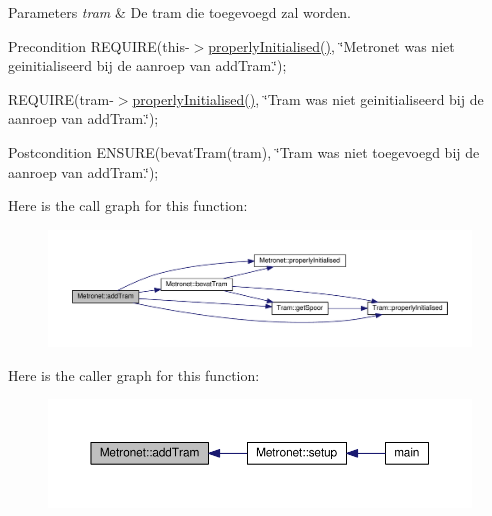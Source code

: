 \begin{DoxyParams}{Parameters}
{\em tram} & De tram die toegevoegd zal worden. \\
\hline
\end{DoxyParams}
\begin{DoxyPrecond}{Precondition}
R\+E\+Q\+U\+I\+RE(this-\/$>$\hyperlink{class_metronet_a3d2adce29a947f162924279b766de645}{properly\+Initialised()}, \char`\"{}\+Metronet was niet geinitialiseerd bij de aanroep van add\+Tram.\char`\"{}); 

R\+E\+Q\+U\+I\+RE(tram-\/$>$\hyperlink{class_metronet_a3d2adce29a947f162924279b766de645}{properly\+Initialised()}, \char`\"{}\+Tram was niet geinitialiseerd bij de aanroep van add\+Tram.\char`\"{}); 
\end{DoxyPrecond}
\begin{DoxyPostcond}{Postcondition}
E\+N\+S\+U\+RE(bevat\+Tram(tram), \char`\"{}\+Tram was niet toegevoegd bij de aanroep van add\+Tram.\char`\"{}); 
\end{DoxyPostcond}


Here is the call graph for this function\+:
\nopagebreak
\begin{figure}[H]
\begin{center}
\leavevmode
\includegraphics[width=350pt]{class_metronet_a3a01132772f4a367d83af40a3c02e224_cgraph}
\end{center}
\end{figure}




Here is the caller graph for this function\+:
\nopagebreak
\begin{figure}[H]
\begin{center}
\leavevmode
\includegraphics[width=350pt]{class_metronet_a3a01132772f4a367d83af40a3c02e224_icgraph}
\end{center}
\end{figure}


